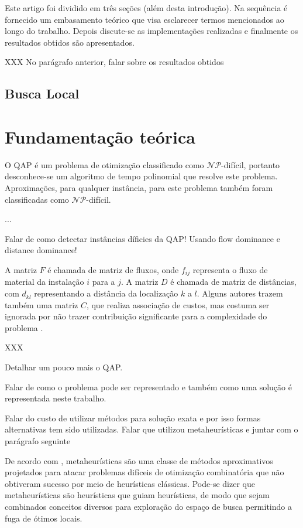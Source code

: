 Este artigo foi dividido em três seções (além desta introdução). Na
sequência é fornecido um embasamento teórico que visa esclarecer
termos mencionados ao longo do trabalho. Depois discute-se as
implementações realizadas e finalmente os resultados obtidos são
apresentados.

XXX No parágrafo anterior, falar sobre os resultados obtidos

\subsection{Busca Local}

\section{Fundamentação teórica}
\label{sec:fund}

O QAP é um problema de otimização classificado como
$\mathcal{NP}$-difícil,
portanto desconhece-se um algoritmo de tempo polinomial que resolve
este problema. Aproximações, para qualquer instância, para este
problema também foram classificadas como $\mathcal{NP}$-difícil.

...

Falar de como detectar instâncias díficies da QAP! Usando flow
dominance e distance dominance!


A matriz $F$ é chamada de matriz de fluxos, onde $f_{ij}$ representa o
fluxo de material da instalação $i$ para a $j$. A matriz $D$ é chamada
de matriz de distâncias, com $d_{kl}$ representando a distância da
localização $k$ a $l$. Alguns autores trazem também uma matriz $C$,
que realiza associação de custos, mas costuma ser ignorada por não
trazer contribuição significante para a complexidade do  problema
\cite{QACO}.

XXX

Detalhar um pouco mais o QAP.

Falar de como o problema pode ser representado e também como uma
solução é representada neste trabalho.

Falar do custo de utilizar métodos para solução exata e
por isso formas alternativas tem sido utilizadas.
Falar que utilizou metaheurísticas e juntar com o parágrafo seguinte

De acordo com \cite{metatheory}, metaheurísticas são uma
classe de métodos aproximativos projetados para atacar problemas
difíceis de otimização combinatória que não obtiveram sucesso por meio
de heurísticas clássicas. Pode-se dizer que metaheurísticas são
heurísticas que guiam heurísticas, de modo que sejam combinados
conceitos diversos para exploração do espaço de busca permitindo a
fuga de ótimos locais.

